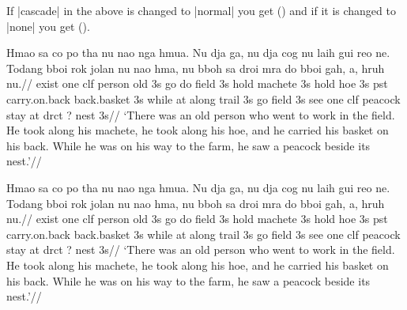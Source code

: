 If |cascade| in the above is changed to |normal| you get (\nextx)
and if it is changed to |none| you get (\anextx).

\framedisplay
\ex[glhangstyle=normal]
\begingl
\gla
Hmao sa co po tha  nu nao nga hmua. Nu dja ga, nu dja cog nu laih
gui reo ne. Todang bboi rok jolan nu nao hma, nu bboh sa droi mra
do bboi gah, a, hruh nu.//
\glb
exist one {clf} person old 3s go do field 3s hold machete 3s hold
hoe 3s pst carry.on.back back.basket 3s while at {along} trail 3s
go field 3s see one clf peacock stay at drct {?} nest 3s//
\glft
`There was an old person who went to work in the field. He took
along his machete, he took along his hoe, and he carried his
basket on his back. While he was on his way to the farm, he saw a
peacock beside its nest.'//
\endgl
\xe
\endframedisplay

\framedisplay
\ex[glhangstyle=none]
\begingl
\gla
Hmao sa co po tha  nu nao nga hmua. Nu dja ga, nu dja cog nu laih
gui reo ne. Todang bboi rok jolan nu nao hma, nu bboh sa droi mra
do bboi gah, a, hruh nu.//
\glb
exist one {clf} person old 3s go do field 3s hold machete 3s hold
hoe 3s pst carry.on.back back.basket 3s while at {along} trail 3s
go field 3s see one clf peacock stay at drct {?} nest 3s//
\glft
`There was an old person who went to work in the field. He took
along his machete, he took along his hoe, and he carried his
basket on his back. While he was on his way to the farm, he saw a
peacock beside its nest.'//
\endgl
\xe
\endframedisplay
\endinput



\pex[glhangstyle=cascade]
\a\begingl
\gla {ya\textrevglotstop y\'a\textrevglotstop t} {i\textglotstop }
{sq\textschwa lq\textschwa ltm\'ix\textsuperscript{w}} {\v{x}m\'inks}
{i\textglotstop } {q\textsuperscript{w}acqns.}//
\glb all \textsc{det} \textsc{ired}-man like-\textsc{(dir)-3sg.erg}
\textsc{det} hat-\textsc{3sg.poss}// \glft Every man likes his hat.//
\endgl

\a\begingl[glhangrightskip=1]
\gla {ya\textrevglotstop y\'a\textrevglotstop t} {i\textglotstop }
{sq\textschwa lq\textschwa ltm\'ix\textsuperscript{w}} {\v{x}m\'inks}
{i\textglotstop } {q\textsuperscript{w}acqns.} {\v{x}m\'inks}
{i\textglotstop } {q\textsuperscript{w}acqns.}//
\glb all \textsc{det} \textsc{ired}-man like-\textsc{(dir)-3sg.erg}
\textsc{det} hat-\textsc{3sg.poss} like-\textsc{(dir)-3sg.erg}
\textsc{det} hat-\textsc{3sg.poss}// \glft Every man likes his hat.//
\endgl

\a\begingl
\gla {ya\textrevglotstop y\'a\textrevglotstop t} {i\textglotstop }
{sq\textschwa lq\textschwa ltm\'ix\textsuperscript{w}} {\v{x}m\'inks}
{i\textglotstop } {q\textsuperscript{w}acqns} {ya\textrevglotstop
y\'a\textrevglotstop t} {i\textglotstop } {sq\textschwa lq\textschwa
ltm\'ix\textsuperscript{w}} {\v{x}m\'inks} {i\textglotstop }
{q\textsuperscript{w}acqns}//
\glb all \textsc{det} \textsc{ired}-man like-\textsc{(dir)-3sg.erg}
\textsc{det} hat-\textsc{3sg.poss} all \textsc{det} \textsc{ired}-man
like-\textsc{(dir)-3sg.erg} \textsc{det} hat-\textsc{3sg.poss}// \glft
Every man likes his hat.//
\endgl
\xe

